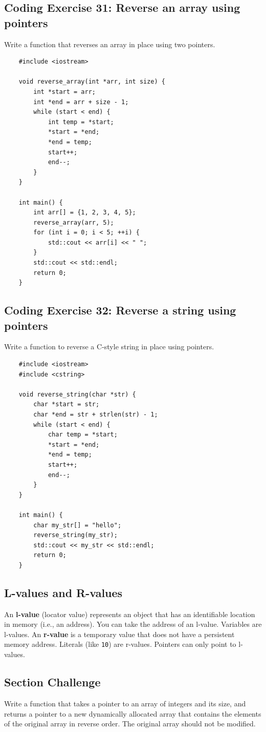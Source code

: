 \subsection{Coding Exercise 31: Reverse an array using pointers}
Write a function that reverses an array in place using two pointers.
\begin{lstlisting}
	#include <iostream>

	void reverse_array(int *arr, int size) {
		int *start = arr;
		int *end = arr + size - 1;
		while (start < end) {
			int temp = *start;
			*start = *end;
			*end = temp;
			start++;
			end--;
		}
	}

	int main() {
		int arr[] = {1, 2, 3, 4, 5};
		reverse_array(arr, 5);
		for (int i = 0; i < 5; ++i) {
			std::cout << arr[i] << " ";
		}
		std::cout << std::endl;
		return 0;
	}
\end{lstlisting}

\subsection{Coding Exercise 32: Reverse a string using pointers}
Write a function to reverse a C-style string in place using pointers.
\begin{lstlisting}
	#include <iostream>
	#include <cstring>

	void reverse_string(char *str) {
		char *start = str;
		char *end = str + strlen(str) - 1;
		while (start < end) {
			char temp = *start;
			*start = *end;
			*end = temp;
			start++;
			end--;
		}
	}

	int main() {
		char my_str[] = "hello";
		reverse_string(my_str);
		std::cout << my_str << std::endl;
		return 0;
	}
\end{lstlisting}

\subsection{L-values and R-values}
An \textbf{l-value} (locator value) represents an object that has an identifiable location in memory (i.e., an address). You can take the address of an l-value. Variables are l-values. An \textbf{r-value} is a temporary value that does not have a persistent memory address. Literals (like \texttt{10}) are r-values. Pointers can only point to l-values.

\subsection{Section Challenge}
Write a function that takes a pointer to an array of integers and its size, and returns a pointer to a new dynamically allocated array that contains the elements of the original array in reverse order. The original array should not be modified.

